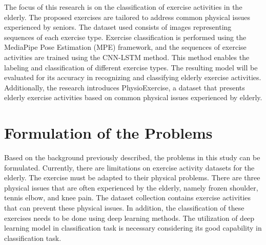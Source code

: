 The focus of this research is on the classification of exercise activities in the elderly. The proposed exercises are tailored to address common physical issues experienced by seniors. The dataset used consists of images representing sequences of each exercise type. Exercise classification is performed using the MediaPipe Pose Estimation (MPE) framework, and the sequences of exercise activities are trained using the CNN-LSTM method. This method enables the labeling and classification of different exercise types. The resulting model will be evaluated for its accuracy in recognizing and classifying elderly exercise activities. Additionally, the research introduces PhysioExercise, a dataset that presents elderly exercise activities based on common physical issues experienced by elderly.


\section{Formulation of the Problems}
\label{sec1:Problems}
Based on the background previously described, the problems in this study can be formulated. Currently, there are limitations on exercise activity datasets for the elderly. The exercise must be adapted to their physical problems. There are three physical issues that are often experienced by the elderly, namely frozen shoulder, tennis elbow, and knee pain. The dataset collection contains exercise activities that can prevent these physical issues. In addition, the classification of these exercises needs to be done using deep learning methods. The utilization of deep learning model in classification task is necessary considering its good capability in classification task. %

